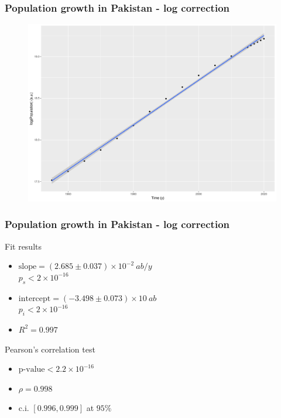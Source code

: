 \documentclass[
	11pt, %
]{beamer}
\begin{document}
\begin{frame}
	\frametitle{Population growth in Pakistan - log correction}
	\begin{figure}
		\includegraphics[width=.75\textwidth]{pak_log.png}
	\end{figure}
\end{frame}

\begin{frame}
	\frametitle{Population growth in Pakistan - log correction}
	\begin{exampleblock}{Fit results}
		\begin{itemize}
			\item $\text{slope} = \left(2.685 \pm 0.037\right) \times 10^{-2} \ ab/y$ \\
				$p_s < 2 \times 10^{-16}$
			\item $\text{intercept} = \left(-3.498 \pm 0.073\right) \times 10 \ ab$ \\
				$p_i < 2 \times 10^{-16}$
			\item $R^2 = 0.997$
		\end{itemize}
	\end{exampleblock}
	\begin{block}{Pearson's correlation test}
		\begin{itemize}
			\item $\text{p-value} < 2.2 \times 10^{-16}$
			\item $\rho = 0.998$
			\item c.i. $\left[0.996, 0.999\right]$ at $95\%$
		\end{itemize}
	\end{block}
\end{frame}
\end{document}
